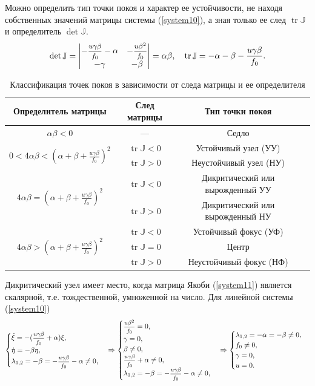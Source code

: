 \documentclass[12pt, a4paper]{article}
\DeclareMathOperator{\tr}{tr}
\begin{document}
Можно определить тип точки покоя и характер ее устойчивости, не находя собственных значений матрицы системы (\ref{system10}), а зная только ее след $\tr \mathbb{J}$ и
определитель $\det \mathbb{J}$.
\[
\det \mathbb{J} =\begin{vmatrix}
	-\sfrac{u\gamma \beta}{f_0}-\alpha & -\sfrac{u\beta^2}{f_0} \\
	-\gamma & -\beta
\end{vmatrix}=
\alpha \beta,
\quad
\tr \mathbb{J}=-\alpha-\beta-\frac{u\gamma \beta}{f_0}.
\]
\begin{table}[H]
	\label{tabl2}
	\centering		
	\caption{Классификация точек покоя в зависимости от следа матрицы и ее определителя}\medskip	
\begin{tabular}{|c|c|c|c|}
	\hline
	Определитель матрицы & След матрицы & Тип точки покоя \\
	\hline
	$\alpha\beta<0$ & --- & Седло\\
	\hline
	\multirow{2}{*}{$0<4\alpha\beta<(\alpha+\beta+\frac{u\gamma\beta}{f_0})^2$} 
	&$\tr\mathbb{J}<0$  & Устойчивый узел (УУ)\\
	\cline {2-3} & $\tr\mathbb{J}>0$ & Неустойчивый узел (НУ)\\
	\hline
	\multirow{2}{*}{$4\alpha\beta=(\alpha+\beta+\frac{u\gamma\beta}{f_0})^2$} & $\tr\mathbb{J}<0$ & Дикритический или вырожденный УУ \\
	\cline {2-3} & $\tr\mathbb{J}>0$ & Дикритический или вырожденный НУ \\
	\hline
	\multirow{3}{*}{$4\alpha\beta>(\alpha+\beta+\frac{u\gamma\beta}{f_0})^2$} 
	&$\tr\mathbb{J}<0$  & Устойчивый фокус (УФ)\\
	\cline {2-3} & $\tr\mathbb{J}=0$ & Центр\\
	\cline {2-3} & $\tr\mathbb{J}>0$ & Неустойчивый фокус (НФ)\\
	\hline
\end{tabular}
\end{table}	

Дикритический узел имеет место, когда матрица Якоби (\ref{system11}) является скалярной, т.е. тождественной, умноженной на число. Для линейной системы (\ref{system10})
\[
\begin{cases}
	\dot \xi=-(\hbox{\footnotesize$\displaystyle\frac{u\gamma \beta}{f_0}$}+\alpha)\xi,\\
	\dot \eta=-\beta \eta,\\
	\lambda_{1,2}=-\beta=-\hbox{\footnotesize$\displaystyle\frac{u\gamma \beta}{f_0}$}-\alpha\ne0,
\end{cases}
\Rightarrow
\begin{cases}
	\hbox{\footnotesize$\displaystyle\frac{u\beta^2}{f_0}$}=0,\\
	\gamma=0,\\
	\beta\ne0,\\
	\hbox{\footnotesize$\displaystyle\frac{u\gamma \beta}{f_0}$}+\alpha\ne0,\\
	\lambda_{1,2}=-\beta=-\hbox{\footnotesize$\displaystyle\frac{u\gamma \beta}{f_0}$}-\alpha\ne0,
\end{cases}
\Rightarrow
\begin{cases}
	\lambda_{1,2}=-\alpha=-\beta\ne0,\\
	f_0\ne0,\\
	\gamma=0,\\
	u=0.
\end{cases}
\]
\end{document}
